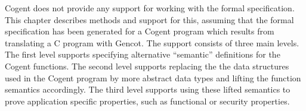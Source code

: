 \documentclass[a4paper]{report}
\begin{document}
Cogent does not provide any support for working with the formal specification. This chapter describes methods
and support for this, assuming that the formal specification has been generated for a Cogent program which results
from translating a C program with Gencot. The support consists of three main levels. The first level supports
specifying alternative ``semantic'' definitions for the Cogent functions. The second level supports replacing the 
the data structures used in the Cogent program by more abstract data types and lifting the function semantics
accordingly. The third level supports using these lifted semantics to prove application specific properties, such
as functional or security properties.



%

%

%
\end{document}
